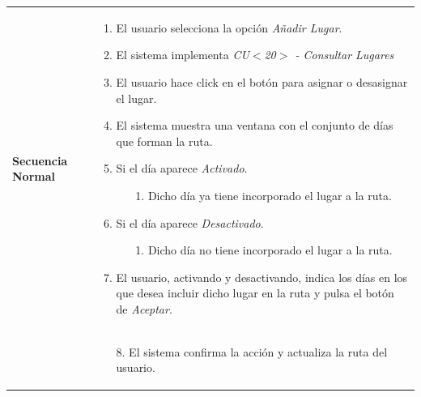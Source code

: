 \begin{longtable}{| p{4cm} | p{10cm} |}
\hline
\textbf{Secuencia Normal} &\mbox{}\par\vspace{-\baselineskip}
\begin{enumerate}[leftmargin=0.7cm, topsep=0.1cm]
\item El usuario selecciona la opción \textit{Añadir Lugar}.
\item El sistema implementa \textit{CU$<$20$>$ - Consultar Lugares}
\item El usuario hace click en el botón para asignar o desasignar el lugar.
\item El sistema muestra una ventana con el conjunto de días que forman la ruta.
\item Si el día aparece \textit{Activado}.
	\begin{itemize}
	\item[1.] Dicho día ya tiene incorporado el lugar a la ruta.
	\end{itemize}
\item Si el día aparece \textit{Desactivado}.
	\begin{itemize}
	\item[1.] Dicho día no tiene incorporado el lugar a la ruta.
	\end{itemize}
\item El usuario, activando y desactivando, indica los días en los que desea incluir dicho lugar en la ruta y pulsa el botón de \textit{Aceptar}.
\end{enumerate}
\\ &\mbox{}\par\vspace{-\baselineskip}	
\begin{enumerate}[leftmargin=0.7cm, topsep=0.1cm]
\item[8.] El sistema confirma la acción y actualiza la ruta del usuario.

\end{enumerate}



\end{longtable}
